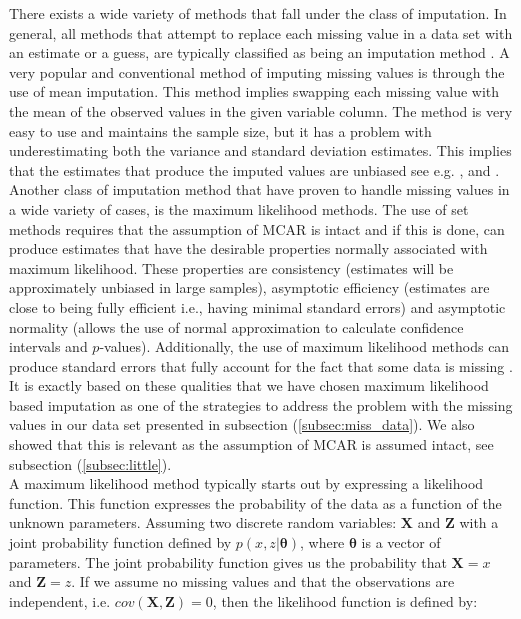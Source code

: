 \documentclass[../thesis.tex]{subfiles}
\begin{document}
\noindent There exists a wide variety of methods that fall under the class of imputation. In general, all methods that attempt to replace each missing value in a data set with an estimate or a guess, are typically classified as being an imputation method \citep{allison1999missing}. A very popular and conventional method of imputing missing values is through the use of mean imputation. This method implies swapping each missing value with the mean of the observed values in the given variable column. The method is very easy to use and maintains the sample size, but it has a problem with underestimating both the variance and standard deviation estimates. This implies that the estimates that produce the imputed values are unbiased see e.g. \cite{scheffer2002dealing}, \cite{enders2010applied} and \cite{eekhout2012brief}. Another class of imputation method that have proven to handle missing values in a wide variety of cases, is the maximum likelihood methods. The use of set methods requires that the assumption of MCAR is intact and if this is done, can produce estimates that have the desirable properties normally associated with maximum likelihood. These properties are consistency (estimates will be approximately unbiased in large samples), asymptotic efficiency (estimates are close to being fully efficient i.e., having minimal standard errors) and asymptotic normality (allows the use of normal approximation to calculate confidence intervals and $p$-values). Additionally, the use of maximum likelihood methods can produce standard errors that fully account for the fact that some data is missing \citep{allison1999missing}. It is exactly based on these qualities that we have chosen maximum likelihood based imputation as one of the strategies to address the problem with the missing values in our data set presented in subsection (\ref{subsec:miss_data}). We also showed that this is relevant as the assumption of MCAR is assumed intact, see subsection (\ref{subsec:little}).\\
\indent A maximum likelihood method typically starts out by expressing a likelihood function. This function expresses the probability of the data as a function of the unknown parameters. Assuming two discrete random variables: $\mathbf{X}$ and $\mathbf{Z}$ with a joint probability function defined by $p(x,z|\boldsymbol{\theta})$, where $\boldsymbol{\theta}$ is a vector of parameters. The joint probability function gives us the probability that $\mathbf{X} = x$ and $\mathbf{Z} = z$. If we assume no missing values and that the observations are independent, i.e. $cov(\mathbf{X}, \mathbf{Z}) = 0$, then the likelihood function is defined by:
\end{document}
